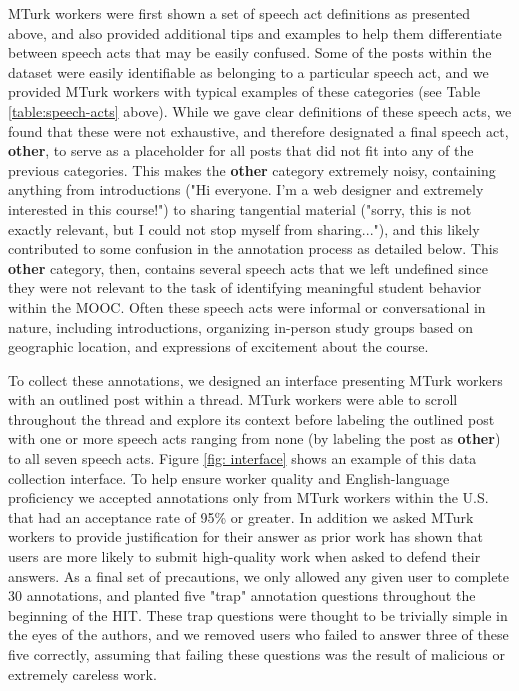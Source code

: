 \documentclass[twoside]{article}
\begin{document}
\par
MTurk workers were first shown a set of speech act definitions as presented above, and also provided additional tips and examples to help them differentiate between speech acts that may be easily confused. Some of the posts within the dataset were easily identifiable as belonging to a particular speech act, and we provided MTurk workers with typical examples of these categories (see Table \ref{table:speech-acts} above). While we gave clear definitions of these speech acts, we found that these were not exhaustive, and therefore designated a final speech act, \textbf{other}, to serve as a placeholder for all posts that did not fit into any of the previous categories. This makes the \textbf{other} category extremely noisy, containing anything from introductions ("Hi everyone. I'm a web designer and extremely interested in this course!") to sharing tangential material ("sorry, this is not exactly relevant, but I could not stop myself from sharing..."), and this likely contributed to some confusion in the annotation process as detailed below. This \textbf{other} category, then, contains several speech acts that we left undefined since they were not relevant to the task of identifying meaningful student behavior within the MOOC. Often these speech acts were informal or conversational in nature, including introductions, organizing in-person study groups based on geographic location, and expressions of excitement about the course.
\par
To collect these annotations, we designed an interface presenting MTurk workers with an outlined post within a thread. MTurk workers were able to scroll throughout the thread and explore its context before labeling the outlined post with one or more speech acts ranging from none (by labeling the post as \textbf{other}) to all seven speech acts. Figure \ref{fig: interface} shows an example of this data collection interface. To help ensure worker quality and English-language proficiency we accepted annotations only from MTurk workers within the U.S. that had an acceptance rate of 95\% or greater. In addition we asked MTurk workers to provide justification for their answer as prior work has shown that users are more likely to submit high-quality work when asked to defend their answers. As a final set of precautions, we only allowed any given user to complete 30 annotations, and planted five "trap" annotation questions throughout the beginning of the HIT. These trap questions were thought to be trivially simple in the eyes of the authors, and we removed users who failed to answer three of these five correctly, assuming that failing these questions was the result of malicious or extremely careless work.
\end{document}
